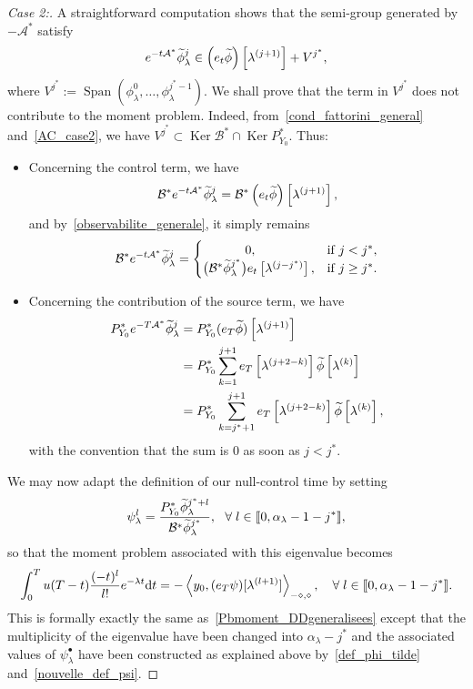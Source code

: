 \documentclass[10pt]{amsart}
\theoremstyle{definition}\newtheorem{defi}[theo]{Definition}\newtheorem{rema}[theo]{Remark}\newtheorem{exam}[theo]{Example}\newtheorem{exem}[theo]{Example}\newtheorem{nota}[theo]{Notation}
\newenvironment{step}[1]{\begin{proof}[#1]}{\let\qed\relax\end{proof}}
\newcommand{\llbracket}{\mathopen{[\mkern -2.7mu[}}
\newcommand{\rrbracket}{\mathclose{]\mkern -2.7mu]}}
\newcommand{\inter}[2]{\llbracket #1,#2 \rrbracket}
\newcommand\As{\mathcal{A}^*}
\newcommand\Bs{\mathcal{B}^*}
\newcommand{\Fzp}{Y_0}
\newcommand{\dual}[2]{\left\langle #1, #2 \right\rangle_{-\diamond,\diamond}}
\newcommand{\PFa}{P_{\Fzp}^*}
\newcommand{\md}{\mathrm{d}}
\DeclareMathOperator{\Span}{Span}
\DeclareMathOperator{\Ker}{Ker}
\renewcommand{\cdot}{{\scriptstyle \bullet}}
\let\oldtilde\tilde
\renewcommand*{\tilde}[1]{\mathchoice{\widetilde{#1}}{\widetilde{#1}}{\oldtilde{#1}}{\oldtilde{#1}}}\let\oldexists\exists
\renewcommand*{\exists}{\mathrel{\oldexists}}
\let\oldforall\forall
\renewcommand*{\forall}{\mathrel{\oldforall}}
\begin{document}
\begin{step}{Case 2:}
A straightforward computation shows that the semi-group generated by $-\As$ satisfy
\[
e^{-t\As} \tilde{\phi}_\lambda^j \in \left(e_t \tilde{\phi}\right)\left[\lambda^{(j+1)}\right] + V^{j^*},
\]
where $V^{j^*} :=
\Span (\phi_\lambda^0,\ldots,\phi_\lambda^{j^*-1})$. We shall prove that the term in $V^{j^*}$ does not contribute to the moment problem. Indeed, from~\eqref{cond_fattorini_general} and~\eqref{AC_case2}, we have $V^{j^*} \subset \Ker \Bs \cap \Ker \PFa$. Thus:
\begin{itemize}
\item Concerning the control term, we have
\[
\Bs e^{-t\As} \tilde{\phi}_\lambda^j = \Bs \left(e_t \tilde{\phi}\right)\left[\lambda^{(j+1)}\right],
\]
and by~\eqref{observabilite_generale}, it simply remains
\[
\Bs e^{-t\As} \tilde{\phi}_\lambda^j =
\begin{cases}
\mkern60mu 0,& \text{if } j<j^*,\\
\big(\Bs \tilde{\phi}_{\lambda}^{j^*}\big) e_t\left[\lambda^{(j-j^*)}\right],& \text{if }j\geq j^*.
\end{cases}
\]
\item Concerning the contribution of the source term, we have
\begin{align*}
\PFa e^{-T\As} \tilde{\phi}_\lambda^j & = \PFa (e_T \tilde{\phi})\left[\lambda^{(j+1)}\right]\\
& = \PFa \sum_{k=1}^{j+1} e_T\left[\lambda^{(j+2-k)}\right] \tilde{\phi}\left[\lambda^{(k)}\right]\\
& = \PFa \sum_{k=j^*+1}^{j+1} e_T\left[\lambda^{(j+2-k)}\right] \tilde{\phi}\left[\lambda^{(k)}\right],
\end{align*}
with the convention that the sum is $0$ as soon as $j<j^*$.
\end{itemize}
We may now adapt the definition of our null-control time by setting
\begin{equation}\label{nouvelle_def_psi}
\psi_\lambda^l = \frac{\PFa \tilde{\phi}_\lambda^{j^*+l}}{\Bs \tilde{\phi}_\lambda^{j^*}}, \ \ \forall l\in \inter{0}{\alpha_\lambda-1-j^*},
\end{equation}
so that the moment problem associated with this eigenvalue becomes
\begin{equation*}
\int_0^T u(T-t) \frac{(-t)^l}{l!} e^{-\lambda t} \md t = -\dual{y_0}{(e_T \psi)[\lambda^{(l+1)}]}, \quad \forall l \in \inter{0}{\alpha_\lambda-1-j^*}.
\end{equation*}
This is formally exactly the same as~\eqref{Pbmoment_DDgeneralisees} except that the multiplicity of the eigenvalue have been changed into $\alpha_\lambda-j^*$ and the associated values of $\psi_\lambda^\cdot$ have been constructed as explained above by~\eqref{def_phi_tilde} and~\eqref{nouvelle_def_psi}.
\end{step}
\end{document}
